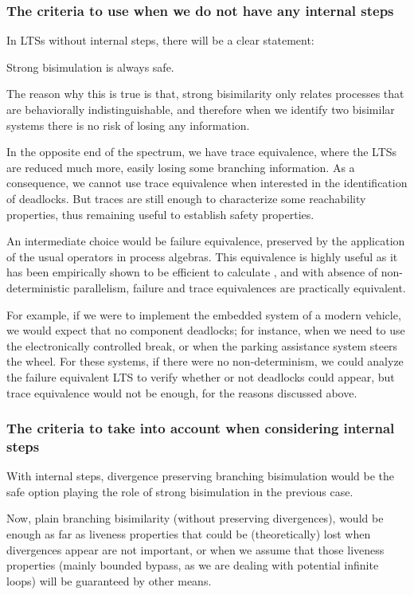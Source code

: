 \documentclass[11pt]{article}
\theoremstyle{definition}
\theoremstyle{plain}
\begin{document}
\subsubsection{The criteria to use when we do not have any internal steps}
In LTSs without internal steps, there will be a clear statement:
\begin{center}
	Strong bisimulation is always safe.
\end{center}

The reason why this is true is that, strong bisimilarity only relates processes that are behaviorally indistinguishable, and therefore when we identify two bisimilar systems there is no risk of losing any information.

In the opposite end of the spectrum, we have trace equivalence, where the LTSs are reduced much more, easily losing some branching information. As a consequence, we cannot use trace equivalence when interested in the identification of deadlocks. But traces are still enough to characterize some reachability properties, thus remaining useful to establish safety properties.

An intermediate choice would be failure equivalence, preserved by the application of the usual operators in process algebras. This equivalence is highly useful as it has been empirically shown to be efficient to calculate \cite{valmari1995failure}, and with absence of non-deterministic parallelism, failure and trace equivalences are practically equivalent.

For example, if we were to implement the embedded system of a modern vehicle, we would expect that no component deadlocks; for instance, when we need to use the electronically controlled break, or when the parking assistance system steers the wheel. For these systems, if there were no non-determinism, we could analyze the failure equivalent LTS to verify whether or not deadlocks could appear, but trace equivalence would not be enough, for the reasons discussed above.

\subsubsection{The criteria to take into account when considering internal steps}

With internal steps, divergence preserving branching bisimulation would be the safe option playing the role of strong bisimulation in the previous case.

Now, plain branching bisimilarity (without preserving divergences), would be enough as far as liveness properties that could be (theoretically) lost when divergences appear are not important, or when we assume that those liveness properties (mainly bounded bypass, as we are dealing with potential infinite loops) will be guaranteed by other means.
\end{document}
